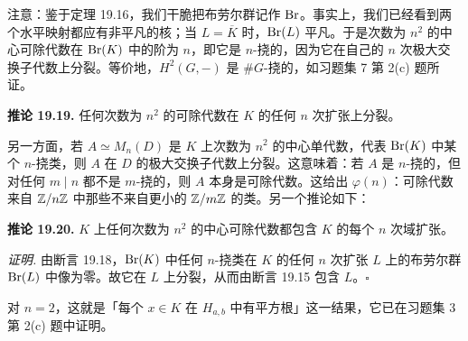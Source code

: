 注意：鉴于定理 19.16，我们干脆把布劳尔群记作 $\operatorname{Br}$。事实上，我们已经看到两个水平映射都应有非平凡的核；当 $L=\overline K$ 时，$\operatorname{Br}(L)$ 平凡。于是次数为 $n^2$ 的中心可除代数在 $\operatorname{Br}(K)$ 中的阶为 $n$，即它是 $n$-挠的，因为它在自己的 $n$ 次极大交换子代数上分裂。等价地，$H^2(G,-)$ 是 $\#G$-挠的，如习题集 7 第 2(c) 题所证。

\textbf{推论 19.19.} 任何次数为 $n^2$ 的可除代数在 $K$ 的任何 $n$ 次扩张上分裂。

另一方面，若 $A\simeq M_n(D)$ 是 $K$ 上次数为 $n^2$ 的中心单代数，代表 $\operatorname{Br}(K)$ 中某个 $n$-挠类，则 $A$ 在 $D$ 的极大交换子代数上分裂。这意味着：若 $A$ 是 $n$-挠的，但对任何 $m\mid n$ 都不是 $m$-挠的，则 $A$ 本身是可除代数。这给出 $\varphi(n)$：可除代数来自 $\mathbb{Z}/n\mathbb{Z}$ 中那些不来自更小的 $\mathbb{Z}/m\mathbb{Z}$ 的类。另一个推论如下：

\textbf{推论 19.20.} $K$ 上任何次数为 $n^2$ 的中心可除代数都包含 $K$ 的每个 $n$ 次域扩张。

\textit{证明.} 由断言 19.18，$\operatorname{Br}(K)$ 中任何 $n$-挠类在 $K$ 的任何 $n$ 次扩张 $L$ 上的布劳尔群 $\operatorname{Br}(L)$ 中像为零。故它在 $L$ 上分裂，从而由断言 19.15 包含 $L$。\hfill$\square$

对 $n=2$，这就是「每个 $x\in K$ 在 $H_{a,b}$ 中有平方根」这一结果，它已在习题集 3 第 2(c) 题中证明。
